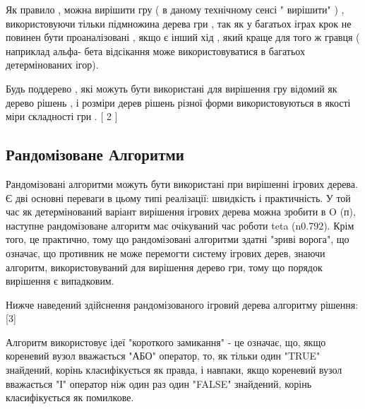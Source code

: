 Як правило , можна вирішити гру ( в даному технічному сенсі " вирішити" ) , використовуючи тільки підмножина дерева гри , так як у багатьох іграх крок не повинен бути проаналізовані , якщо є інший хід , який краще для того ж гравця ( наприклад альфа- бета відсікання може використовуватися в багатьох детермінованих ігор).

Будь поддерево , які можуть бути використані для вирішення гру відомий як дерево рішень , і розміри дерев рішень різної форми використовуються в якості міри складності гри . [ 2 ]

\subsection{Рандомізоване Алгоритми}
Рандомізовані алгоритми можуть бути використані при вирішенні ігрових дерева. Є дві основні переваги в цьому типі реалізації: швидкість і практичність. У той час як детермінований варіант вирішення ігрових дерева можна зробити в O (п), наступне рандомізоване алгоритм має очікуваний час роботи teta (n0.792). Крім того, це практично, тому що рандомізовані алгоритми здатні "зриві ворога", що означає, що противник не може перемогти систему ігрових дерев, знаючи алгоритм, використовуваний для вирішення дерево гри, тому що порядок вирішення є випадковим. 

Нижче наведений здійснення рандомізованого ігровий дерева алгоритму рішення: [3]


Алгоритм використовує ідеї "короткого замикання" - це означає, що, якщо кореневий вузол вважається "АБО" оператор, то, як тільки один "TRUE" знайдений, корінь класифікується як правда, і навпаки, якщо кореневий вузол вважається "І" оператор ніж один раз один "FALSE" знайдений, корінь класифікується як помилкове.